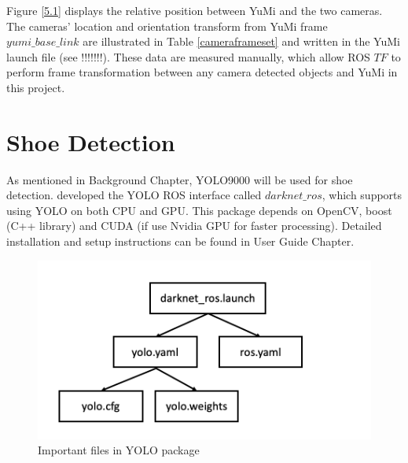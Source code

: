 Figure \ref{5.1} displays the relative position between YuMi and the two cameras. The cameras' location and orientation transform from YuMi frame $yumi\_base\_link$ are illustrated in Table \ref{cameraframeset} and written in the YuMi launch file (see !!!!!!!). These data are measured manually, which allow ROS $TF$ to perform frame transformation between any camera detected objects and YuMi in this project. 
\begin{table}[H]
\centering
{}
\caption{Transform settings between YuMi and cameras}
\label{cameraframeset}
\end{table}

\section{Shoe Detection} \label{shoedetection}
As mentioned in Background Chapter, YOLO9000 will be used for shoe detection. \citep{bjelonicYolo2018} developed the YOLO ROS interface called $darknet\_ros$, which supports using YOLO on both CPU and GPU. This package depends on OpenCV, boost (C++ library) and CUDA (if use Nvidia GPU for faster processing). Detailed installation and setup instructions can be found in User Guide Chapter. 

\begin{figure}[H]
\centering
\includegraphics[width = 0.6\columnwidth]{Implementation/cv/yolofile.png}
\caption{Important files in YOLO package}
\label{yolofolder}
\end{figure}

